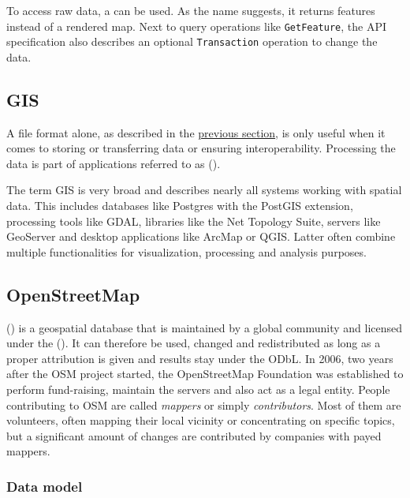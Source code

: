 			To access raw data, a  can be used\cite{ogc-wfs}.
			As the name suggests, it returns features instead of a rendered map.
			Next to query operations like \texttt{GetFeature}, the API specification also describes an optional \texttt{Transaction} operation to change the data.
	
	\subsection{GIS}
	
		A file format alone, as described in the \hyperref[subsec:file-formats]{previous section}, is only useful when it comes to storing or transferring data or ensuring interoperability.
		Processing the data is part of applications referred to as  ().
		
		The term GIS is very broad and describes nearly all systems working with spatial data.
		This includes databases like Postgres with the PostGIS extension, processing tools like GDAL, libraries like the Net Topology Suite, servers like GeoServer and desktop applications like ArcMap or QGIS.
		Latter often combine multiple functionalities for visualization, processing and analysis purposes.
	
	\subsection{OpenStreetMap}
	\label{subsec:osm}
	
		 () is a geospatial database that is maintained by a global community and licensed under the  ()\cite{osm-wiki-about}.
		It can therefore be used, changed and redistributed as long as a proper attribution is given and results stay under the ODbL\cite{odbl-summary}.
		In 2006, two years after the OSM project started, the OpenStreetMap Foundation was established to perform fund-raising, maintain the servers and also act as a legal entity.
		People contributing to OSM are called \textit{mappers} or simply \textit{contributors}.
		Most of them are volunteers, often mapping their local vicinity or concentrating on specific topics, but a significant amount of changes are contributed by companies with payed mappers\cite{osm-corporate-mappers}.
		
		\subsubsection{Data model}
		
